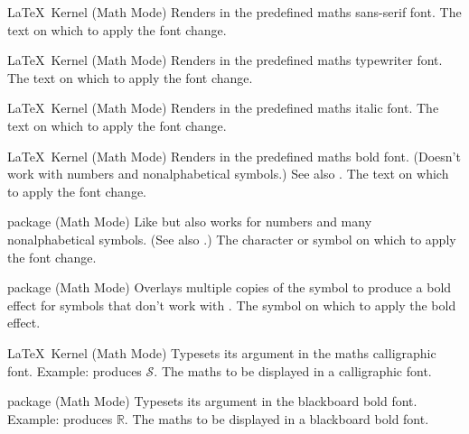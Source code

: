%
 {}%
 {\LaTeX\ Kernel (Math Mode)}%
 {Renders  in the predefined maths sans-serif font.}%
 {%
   \BeginArgList
      The text on which to apply the font change.
   \EndArgList
 }

%
 {}%
 {\LaTeX\ Kernel (Math Mode)}%
 {Renders  in the predefined maths typewriter font.}%
 {%
   \BeginArgList
      The text on which to apply the font change.
   \EndArgList
 }

%
 {}%
 {\LaTeX\ Kernel (Math Mode)}%
 {Renders  in the predefined maths italic font.}%
 {%
   \BeginArgList
      The text on which to apply the font change.
   \EndArgList
 }

%
 {}%
 {\LaTeX\ Kernel (Math Mode)}%
 {Renders  in the predefined maths bold font. (Doesn't
  work with numbers and nonalphabetical symbols.) See also .}%
 {%
   \BeginArgList
      The text on which to apply the font change.
   \EndArgList
 }

%
 {}%
 { package (Math Mode)}%
 {Like  but also works for numbers and
   many nonalphabetical symbols. (See also .)}%
 {%
   \BeginArgList
      The character or symbol on which to apply the font change.
   \EndArgList
 }

%
 {}%
 { package (Math Mode)}%
 { Overlays multiple copies of the symbol to
   produce a bold effect for symbols that don't work with
   .}%
 {%
   \BeginArgList
      The symbol on which to apply the bold
      effect.
   \EndArgList
 }

%
 {}%
 {\LaTeX\ Kernel (Math Mode)}%
 {Typesets its argument in the maths calligraphic font.
  Example: \protect{} produces
 \ensuremath{\mathcal{S}}.}%
 {%
   \BeginArgList
     The maths to be displayed in a calligraphic
      font.
   \EndArgList
 }

%
 {}%
 { package (Math Mode)}%
 {Typesets its argument in the blackboard bold font.
  Example: \protect{} produces
  \ensuremath{\mathbb{R}}.}%
 {%
   \BeginArgList
     The maths to be displayed in a blackboard
      bold font.
   \EndArgList
 }

